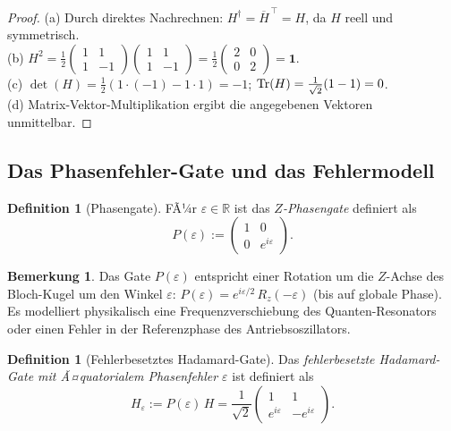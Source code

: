 ﻿\documentclass[11pt,a4paper]{article}
\theoremstyle{definition}
\newtheorem{definition}[theorem]{Definition}
\newtheorem{remark}[theorem]{Bemerkung}
\newcommand{\eps}{\varepsilon}
\newcommand{\Heps}{H_{\!\varepsilon}}
\newcommand{\R}{\mathbb{R}}
\begin{document}
\begin{proof}
  (a) Durch direktes Nachrechnen:
  $H^\dagger = \overline{H}^{\,\top} = H$, da $H$ reell und symmetrisch.\\
  (b) $H^2 = \frac{1}{2}\begin{pmatrix}1&1\\1&-1\end{pmatrix}
  \begin{pmatrix}1&1\\1&-1\end{pmatrix}
  = \frac{1}{2}\begin{pmatrix}2&0\\0&2\end{pmatrix} = \mathbf{1}$.\\
  (c) $\det(H)= \frac{1}{2}(1\cdot(-1)-1\cdot 1)=-1$; $\Tr(H)=\frac{1}{\sqrt{2}}(1-1)=0$.\\
  (d) Matrix-Vektor-Multiplikation ergibt die angegebenen Vektoren unmittelbar.
\end{proof}

\subsection{Das Phasenfehler-Gate und das Fehlermodell}
\label{subsec:error_model}

\begin{definition}[Phasengate]
  FÃ¼r $\eps\in\R$ ist das \emph{$Z$-Phasengate} definiert als
  \begin{equation}
    P(\eps) := \begin{pmatrix} 1 & 0 \\ 0 & e^{i\eps} \end{pmatrix}.
    \label{eq:P_def}
  \end{equation}
\end{definition}

\begin{remark}
  Das Gate $P(\eps)$ entspricht einer Rotation um die $Z$-Achse des
  Bloch-Kugel um den Winkel $\eps$: $P(\eps) = e^{i\eps/2}\,R_z(-\eps)$
  (bis auf globale Phase).  Es modelliert physikalisch eine
  Frequenzverschiebung des Quanten-Resonators oder einen Fehler in der
  Referenzphase des Antriebsoszillators.
\end{remark}

\begin{definition}[Fehlerbesetztes Hadamard-Gate]
  Das \emph{fehlerbesetzte Hadamard-Gate mit Ã¤quatorialem Phasenfehler $\eps$}
  ist definiert als
  \begin{equation}
    \Heps := P(\eps)\,H
    = \frac{1}{\sqrt{2}} \begin{pmatrix} 1 & 1 \\ e^{i\eps} & -e^{i\eps} \end{pmatrix}.
    \label{eq:Heps_def}
  \end{equation}
\end{definition}
\end{document}
